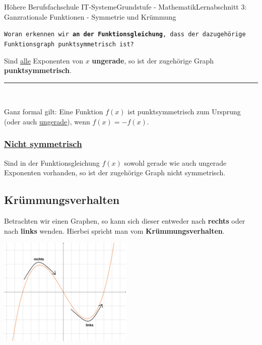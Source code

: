 \documentclass[11pt,twocolumn,oneside,openany,headings=optiontotoc,11pt,numbers=noenddot]{article}
\begin{document}
\begin{worksheet}{Höhere Berufsfachschule IT-Systeme}{Grundstufe - Mathematik}{Lernabschnitt 3: Ganzrationale Funktionen - Symmetrie und Krümmung}
		\par\noindent
		\texttt{Woran erkennen wir \textbf{an der Funktionsgleichung}, dass der dazugehörige Funktionsgraph punktsymmetrisch ist?}
		\begin{framed}
			Sind \underline{alle} Exponenten von \(x\) \textbf{ungerade}, so ist der zugehörige Graph \textbf{punktsymmetrisch}.\\
			\par\noindent
			\rule{\textwidth}{0.1pt}\\
			\par\noindent
			Ganz formal gilt: Eine Funktion \(f(x)\) ist punktsymmetrisch zum Ursprung (oder auch \underline{ungerade}), wenn \(f(x) = -f(x)\).
		\end{framed}
		\subsubsection{\underline{Nicht symmetrisch}}
		Sind in der Funktionsgleichung \(f(x)\) sowohl gerade wie auch ungerade Exponenten vorhanden, so ist der zugehörige Graph nicht symmetrisch.
		\subsection{Krümmungsverhalten}
		Betrachten wir einen Graphen, so kann sich dieser entweder nach \textbf{rechts} oder nach \textbf{links} wenden. Hierbei spricht man vom \textbf{Krümmungsverhalten}.\\
		\par\noindent
		\includegraphics[width=0.48\textwidth]{../99_Bilder/RL.jpg}\\
	\end{worksheet}
\end{document}
